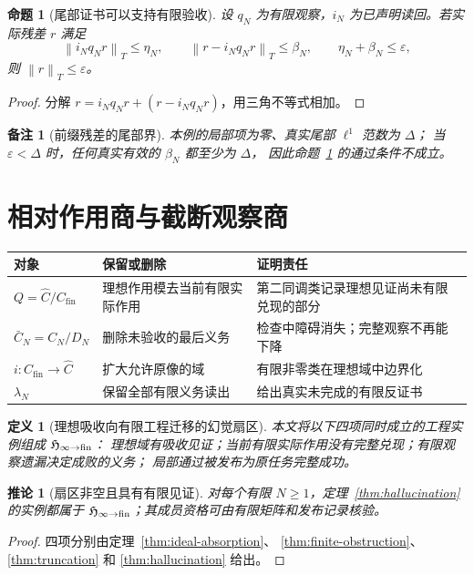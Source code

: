 \documentclass[12pt,a4paper,openany]{report}
\newtheorem{definition}{定义}[chapter]
\newtheorem{proposition}{命题}[chapter]
\newtheorem{corollary}{推论}[chapter]
\newtheorem{remark}{备注}[chapter]
\numberwithin{equation}{chapter}
\newcommand{\cfin}{C_{\mathrm{fin}}}
\newcommand{\chat}{\widehat C}
\newcommand{\Norm}[1]{\left\lVert#1\right\rVert}
\begin{document}
\begin{CJK*}{UTF8}{gkai}
\begin{proposition}[尾部证书可以支持有限验收]
\label{prop:tail}
设 $q_N$ 为有限观察，$i_N$ 为已声明读回。若实际残差 $r$ 满足
\[
 \Norm{i_Nq_Nr}_T\le\eta_N,\qquad
 \Norm{r-i_Nq_Nr}_T\le\beta_N,\qquad
 \eta_N+\beta_N\le\varepsilon,
\]
则 $\Norm r_T\le\varepsilon$。
\end{proposition}
\begin{proof}
分解 $r=i_Nq_Nr+(r-i_Nq_Nr)$，用三角不等式相加。
\end{proof}

\begin{remark}[前缀残差的尾部界]
本例的局部项为零、真实尾部 $\ell^1$ 范数为 $\Delta$；
当 $\varepsilon<\Delta$ 时，任何真实有效的 $\beta_N$ 都至少为 $\Delta$，
因此命题~\ref{prop:tail} 的通过条件不成立。
\end{remark}

\section{相对作用商与截断观察商}

\begin{center}
\begin{tabular}{P{0.28\textwidth}P{0.30\textwidth}P{0.33\textwidth}}
\toprule
对象 & 保留或删除 & 证明责任\\
\midrule
$Q=\chat/\cfin$ & 理想作用模去当前有限实际作用 & 第二同调类记录理想见证尚未有限兑现的部分\\
$\bar C_N=C_N/D_N$ & 删除未验收的最后义务 & 检查中障碍消失；完整观察不再能下降\\
$i:\cfin\to\chat$ & 扩大允许原像的域 & 有限非零类在理想域中边界化\\
$\lambda_N$ & 保留全部有限义务读出 & 给出真实未完成的有限反证书\\
\bottomrule
\end{tabular}
\end{center}

\begin{definition}[理想吸收向有限工程迁移的幻觉扇区]
\label{def:hall-sector}
本文将以下四项同时成立的工程实例组成 $\mathfrak H_{\infty\to{\rm fin}}$：
理想域有吸收见证；当前有限实际作用没有完整兑现；有限观察遗漏决定成败的义务；
局部通过被发布为原任务完整成功。
\end{definition}

\begin{corollary}[扇区非空且具有有限见证]
对每个有限 $N\ge1$，定理~\ref{thm:hallucination} 的实例都属于
$\mathfrak H_{\infty\to{\rm fin}}$；其成员资格可由有限矩阵和发布记录核验。
\end{corollary}
\begin{proof}
四项分别由定理~\ref{thm:ideal-absorption}、
\ref{thm:finite-obstruction}、\ref{thm:truncation} 和
\ref{thm:hallucination} 给出。
\end{proof}


\end{CJK*}
\end{document}
